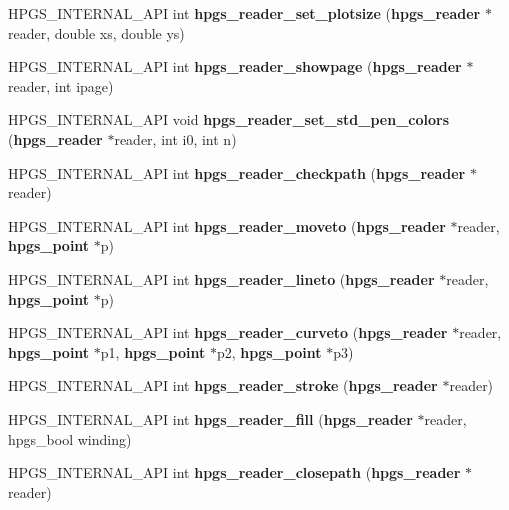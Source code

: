 \begin{DoxyCompactItemize}
\item 
HPGS\_\-INTERNAL\_\-API int {\bfseries hpgs\_\-reader\_\-set\_\-plotsize} ({\bf hpgs\_\-reader} $\ast$reader, double xs, double ys)\label{group__reader_ga7cc94f7b85f7a36aac505caf0a50b999}

\item 
HPGS\_\-INTERNAL\_\-API int {\bfseries hpgs\_\-reader\_\-showpage} ({\bf hpgs\_\-reader} $\ast$reader, int ipage)\label{group__reader_ga76c2b7dd212ad6e070a402292ad5122b}

\item 
HPGS\_\-INTERNAL\_\-API void {\bfseries hpgs\_\-reader\_\-set\_\-std\_\-pen\_\-colors} ({\bf hpgs\_\-reader} $\ast$reader, int i0, int n)\label{group__reader_ga483b4e78037cead23625259c92a529f2}

\item 
HPGS\_\-INTERNAL\_\-API int {\bfseries hpgs\_\-reader\_\-checkpath} ({\bf hpgs\_\-reader} $\ast$reader)\label{group__reader_gadf06a6ca3a27c7e4bc3dd88be6e31d70}

\item 
HPGS\_\-INTERNAL\_\-API int {\bfseries hpgs\_\-reader\_\-moveto} ({\bf hpgs\_\-reader} $\ast$reader, {\bf hpgs\_\-point} $\ast$p)\label{group__reader_ga6b513e1487735f80cc5c8ae95b81f8ec}

\item 
HPGS\_\-INTERNAL\_\-API int {\bfseries hpgs\_\-reader\_\-lineto} ({\bf hpgs\_\-reader} $\ast$reader, {\bf hpgs\_\-point} $\ast$p)\label{group__reader_ga09a8bc8661fdc23551f476a77397c567}

\item 
HPGS\_\-INTERNAL\_\-API int {\bfseries hpgs\_\-reader\_\-curveto} ({\bf hpgs\_\-reader} $\ast$reader, {\bf hpgs\_\-point} $\ast$p1, {\bf hpgs\_\-point} $\ast$p2, {\bf hpgs\_\-point} $\ast$p3)\label{group__reader_ga162d23e7cf5ce4651e71134865e85120}

\item 
HPGS\_\-INTERNAL\_\-API int {\bfseries hpgs\_\-reader\_\-stroke} ({\bf hpgs\_\-reader} $\ast$reader)\label{group__reader_ga0b36071af0bf02444c2610401d59b3b9}

\item 
HPGS\_\-INTERNAL\_\-API int {\bfseries hpgs\_\-reader\_\-fill} ({\bf hpgs\_\-reader} $\ast$reader, hpgs\_\-bool winding)\label{group__reader_gabb6d9e05bfbcf4b99ae389bc23f3e1c6}

\item 
HPGS\_\-INTERNAL\_\-API int {\bfseries hpgs\_\-reader\_\-closepath} ({\bf hpgs\_\-reader} $\ast$reader)\label{group__reader_ga58959cd98027b41a3abc3a90920e6a88}


\end{DoxyCompactItemize}

